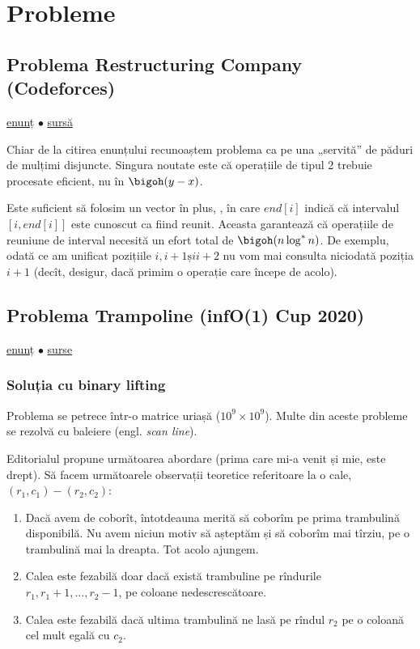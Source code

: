 \section{Probleme}

\subsection{Problema Restructuring Company (Codeforces)}
\label{problem:restructuring-company}

\href{https://codeforces.com/contest/566/problem/D}{enunț}
$\bullet$
\hyperref[code:restructuring-company]{sursă}

Chiar de la citirea enunțului recunoaștem problema ca pe una „servită” de păduri de mulțimi disjuncte. Singura noutate este că operațiile de tipul 2 trebuie procesate eficient, nu în $\bigoh(y - x)$.

Este suficient să folosim un vector în plus, , în care $end[i]$ indică că intervalul $[i, end[i]]$ este cunoscut ca fiind reunit. Aceasta garantează că operațiile de reuniune de interval necesită un efort total de $\bigoh(n \log^{*} n)$. De exemplu, odată ce am unificat pozițiile $i, i + 1 și i + 2$ nu vom mai consulta niciodată poziția $i + 1$ (decît, desigur, dacă primim o operație care începe de acolo).


\subsection{Problema Trampoline (infO(1) Cup 2020)}
\label{problem:trampoline}

\href{https://kilonova.ro/problems/3275}{enunț}
$\bullet$
\hyperref[code:trampoline]{surse}

\subsubsection*{Soluția cu binary lifting}

Problema se petrece într-o matrice uriașă ($10^9 \times 10^9$). Multe din aceste probleme se rezolvă cu baleiere (engl. \textit{scan line}).

Editorialul propune următoarea abordare (prima care mi-a venit și mie, este drept). Să facem următoarele observații teoretice referitoare la o  cale, $(r_1,c_1)-(r_2,c_2)$:

\begin{enumerate}
  \item Dacă avem de coborît, întotdeauna merită să coborîm pe prima trambulină disponibilă. Nu avem niciun motiv să așteptăm și să coborîm mai tîrziu, pe o trambulină mai la dreapta. Tot acolo ajungem.

  \item Calea este fezabilă doar dacă există trambuline pe rîndurile $r_1, r_1 + 1, \dots, r_2 - 1$, pe coloane nedescrescătoare.

  \item Calea este fezabilă dacă ultima trambulină ne lasă pe rîndul  $r_2$ pe o coloană cel mult egală cu $c_2$.
\end{enumerate}

